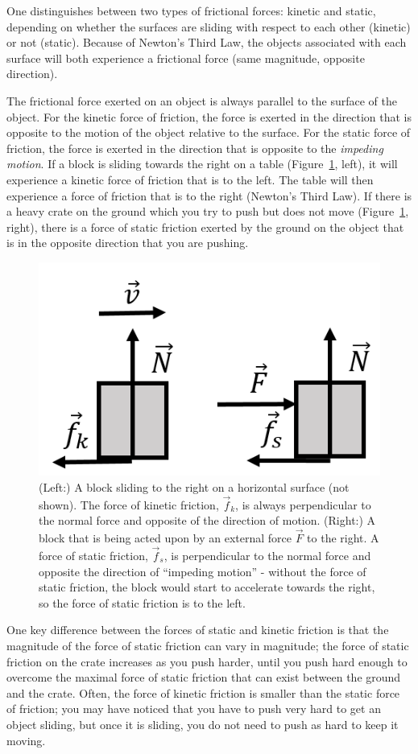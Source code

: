 One distinguishes between two types of frictional forces: kinetic and static, depending on whether the surfaces are sliding with respect to each other (kinetic) or not (static). Because of Newton's Third Law, the objects associated with each surface will both experience a frictional force (same magnitude, opposite direction).

The frictional force exerted on an object is always parallel to the surface of the object. For the kinetic force of friction, the force is exerted in the direction that is opposite to the motion of the object relative to the surface. For the static force of friction, the force is exerted in the direction that is opposite to the \textit{impeding motion}. If a block is sliding towards the right on a table (Figure~\ref{fig:newtonslaws:friction}, left), it will experience a kinetic force of friction that is to the left. The table will then experience a force of friction that is to the right (Newton's Third Law). If there is a heavy crate on the ground which you try to push but does not move (Figure~\ref{fig:newtonslaws:friction}, right), there is a force of static friction exerted by the ground on the object that is in the opposite direction that you are pushing.

\begin{figure}[!htbp]
\centering
\includegraphics[width=0.5\linewidth]{files/friction-f83362359d4ac6cb10c1abc491c3f88c.png}
\caption[]{(Left:) A block sliding to the right on a horizontal surface (not shown). The force of kinetic friction, $\vec f_k$, is always perpendicular to the normal force and opposite of the direction of motion. (Right:) A block that is being acted upon by an external force $\vec F$ to the right. A force of static friction, $\vec f_s$, is perpendicular to the normal force and opposite the direction of ``impeding motion'' - without the force of static friction, the block would start to accelerate towards the right, so the force of static friction is to the left.}
\label{fig:newtonslaws:friction}
\end{figure}

One key difference between the forces of static and kinetic friction is that the magnitude of the force of static friction can vary in magnitude; the force of static friction on the crate increases as you push harder, until you push hard enough to overcome the maximal force of static friction that can exist between the ground and the crate. Often, the force of kinetic friction is smaller than the static force of friction; you may have noticed that you have to push very hard to get an object sliding, but once it is sliding, you do not need to push as hard to keep it moving.

